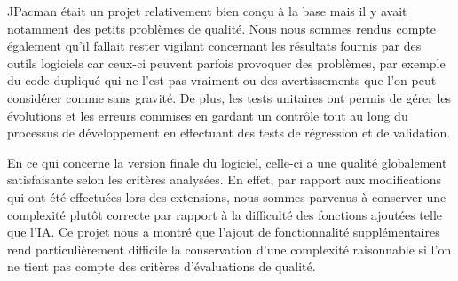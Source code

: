 \documentclass[12pt, openany]{report}
\begin{document}
JPacman était un projet relativement bien conçu à la base mais il y avait notamment des petits problèmes de qualité. Nous nous sommes rendus compte également qu'il fallait rester vigilant concernant les résultats fournis par des outils logiciels car ceux-ci peuvent parfois provoquer des problèmes, par exemple du code dupliqué qui ne l'est pas vraiment ou des avertissements que l'on peut considérer comme sans gravité. De plus, les tests unitaires ont permis de gérer les évolutions et les erreurs commises en gardant un contrôle tout au long du processus de développement en effectuant des tests de régression et de validation.

En ce qui concerne la version finale du logiciel, celle-ci a une qualité globalement satisfaisante selon les critères analysées. En effet, par rapport aux modifications qui ont été effectuées lors des extensions, nous sommes parvenus à conserver une complexité plutôt correcte par rapport à la difficulté des fonctions ajoutées telle que l'IA. Ce projet nous a montré que l'ajout de fonctionnalité supplémentaires rend particulièrement difficile la conservation d'une complexité raisonnable si l'on ne tient pas compte des critères d'évaluations de qualité.
\end{document}
